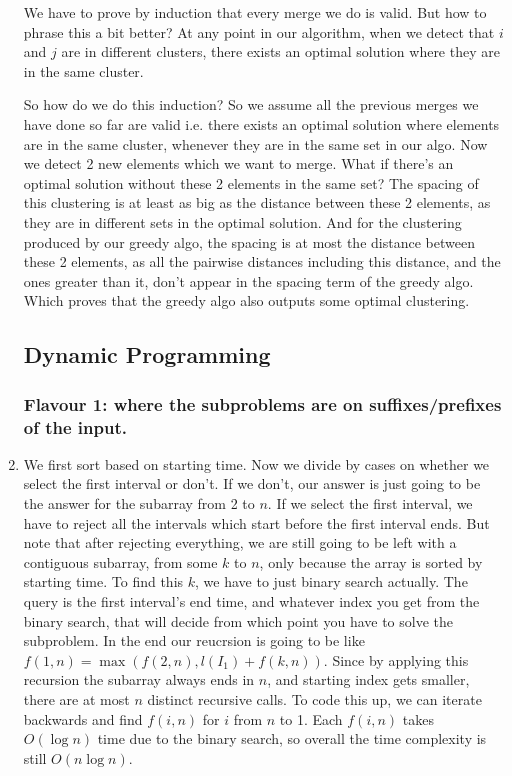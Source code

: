 \documentclass[12pt]{report}
\begin{document}
\begin{enumerate}[label=\textbf{\arabic*.}]
  We have to prove by induction that every merge we do is valid. But how to phrase this a bit better? At any point in our algorithm, when we detect that $i$ and $j$ are in different clusters, 
  there exists an optimal solution where they are in the same cluster.

  So how do we do this induction? So we assume all the previous merges we have done so far are valid i.e. there exists an optimal solution where elements are in the same cluster, whenever
  they are in the same set in our algo. Now we detect 2 new elements which we want to merge. What if there's an optimal solution without these 2 elements in the same set? The spacing of this 
  clustering is at least as big as the distance between these 2 elements, as they are in different sets in the optimal solution. And for the clustering produced by our greedy algo, the spacing
  is at most the distance between these 2 elements, as all the pairwise distances including this distance, and the ones greater than it, don't appear in the spacing term of the greedy algo. Which 
  proves that the greedy algo also outputs some optimal clustering.

  \subsection*{\Large\bfseries Dynamic Programming}

  \subsubsection*{Flavour 1: where the subproblems are on suﬃxes/preﬁxes of the input.}

  \item We first sort based on starting time. Now we divide by cases on whether we select the first interval or don't. If we don't, our answer is just going to be the answer for the subarray from
  2 to $n$. If we select the first interval, we have to reject all the intervals which start before the first interval ends. But note that after rejecting everything, we are still going to be left 
  with a contiguous subarray, from some $k$ to $n$, only because the array is sorted by starting time. To find this $k$, we have to just binary search actually. The query is the first interval's 
  end time, and whatever index you get from the binary search, that will decide from which point you have to solve the subproblem. In the end our reucrsion is going to be like
  $f(1, n) = \max(f(2,n), l(I_1)+f(k,n))$. Since by applying this recursion the subarray always ends in $n$, and starting index gets smaller, there are at most $n$ distinct recursive calls. To code this 
  up, we can iterate backwards and find $f(i, n)$ for $i$ from $n$ to 1. Each $f(i, n)$ takes $O(\log n)$ time due to the binary search, so overall the time complexity is still $O(n \log n)$.


\end{enumerate}
\end{document}
